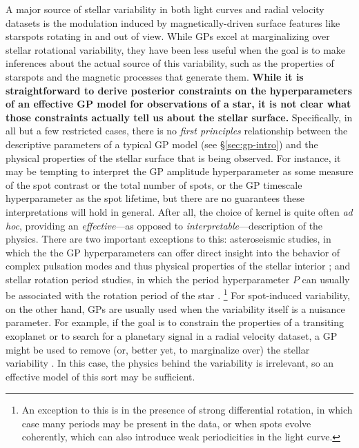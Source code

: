 \documentclass[modern,linenumbers]{aastex62}
\newcommand{\edited}[1]{\textbf{#1}}
\begin{document}
A major source of stellar variability in both light curves and radial velocity
datasets is the modulation induced by magnetically-driven surface features like starspots
rotating in and out of view. While GPs excel at marginalizing over stellar rotational
variability, they have been less useful when the goal is to make
inferences about the actual source of this variability, such as the
properties of starspots and the magnetic processes that generate them.
\edited{While it is straightforward to derive
    posterior constraints on the hyperparameters of an effective GP model for
    observations of a star, it is not clear what those constraints actually
    tell us about the stellar surface.}
Specifically, in all but a few restricted cases, there is no \emph{first principles}
relationship between the descriptive parameters of a typical GP model
(see \S\ref{sec:gp-intro})
and the physical properties of the stellar surface that is being observed.
%
For instance, it may be tempting to interpret the GP amplitude hyperparameter
as some measure of the spot contrast or the total number of spots,
or the GP timescale hyperparameter as the
spot lifetime, but there are no guarantees these interpretations will
hold in general. After all, the choice of kernel is quite often \emph{ad hoc},
providing an \emph{effective}---as opposed to \emph{interpretable}---description
of the physics.
%
There are two important exceptions to this: asteroseismic studies, in which the
the GP hyperparameters can offer direct insight into
the behavior of complex pulsation modes and thus physical properties of the
stellar interior \citep[e.g.,][]{BrewerStello2009,ForemanMackey2017}; and
stellar rotation period studies, in which the period hyperparameter $P$ can usually
be associated with the rotation period of the star \citep[e.g.,][]{Angus2018}.%
\footnote{An exception to this is in the presence of strong differential
    rotation, in which case many periods may be present in the data, or
    when spots evolve coherently, which can also introduce weak periodicities
    in the light curve.}
%
For spot-induced variability, on the other hand,
GPs are usually used
when the variability itself is a nuisance parameter. For example, if the
goal is to constrain the properties of a transiting exoplanet or to
search for a planetary signal in a radial velocity dataset, a GP might be
used to remove (or, better yet, to marginalize over) the stellar variability
\citep[e.g.,][]{Haywood2014,Rajpaul2015,Luger2017b}.
In this case, the physics behind the variability is irrelevant, so an
effective model of this sort may be sufficient.
\end{document}
